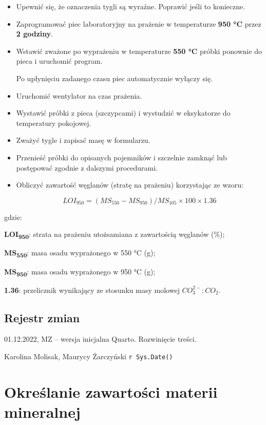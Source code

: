 \documentclass[
  letterpaper,
  DIV=11,
  numbers=noendperiod]{scrreprt}
\begin{document}
\begin{itemize}
\item
  Upewnić się, że oznaczenia tygli są wyraźne. Poprawić jeśli to
  konieczne.
\item
  Zaprogramować piec laboratoryjny na prażenie w temperaturze
  \textbf{950 °C} przez \textbf{2 godziny}.
\item
  Wstawić zważone po wyprażeniu w temperaturze \textbf{550 °C} próbki
  ponownie do pieca i uruchomić program.

  Po upłynięciu zadanego czasu piec automatycznie wyłączy się.
\item
  Uruchomić wentylator na czas prażenia.
\item
  Wystawić próbki z pieca (szczypcami) i wystudzić w eksykatorze do
  temperatury pokojowej.
\item
  Zważyć tygle i zapisać masę w formularzu.
\item
  Przenieść próbki do opisanych pojemników i szczelnie zamknąć lub
  postępować zgodnie z dalszymi procedurami.
\item
  Obliczyć zawartość węglanów (stratę na prażeniu) korzystając ze wzoru:

  \[
  LOI_{950} = (MS_{550} - MS_{950}) / MS_{105} × 100 × 1.36
  \]
\end{itemize}

gdzie:

\textbf{LOI\textsubscript{950}}: strata na prażeniu utożsamiana z
zawartością węglanów (\%);

\textbf{MS\textsubscript{550}}: masa osadu wyprażonego w 550 °C (g);

\textbf{MS\textsubscript{950}}: masa osadu wyprażonego w 950 °C (g);

\textbf{1.36}: przelicznik wynikający ze stosunku masy molowej
\(CO_3^{2-}:CO_2\).

\hypertarget{rejestr-zmian-10}{%
\section{Rejestr zmian}\label{rejestr-zmian-10}}

01.12.2022, MZ -- wersja inicjalna Quarto. Rozwinięcie treści.

Karolina Molisak, Maurycy Żarczyński \texttt{r\ Sys.Date()}

\hypertarget{okreux15blanie-zawartoux15bci-materii-mineralnej}{%
\chapter{Określanie zawartości materii
mineralnej}\label{okreux15blanie-zawartoux15bci-materii-mineralnej}}
\end{document}
